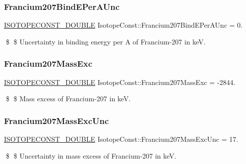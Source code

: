\subsubsection{\texorpdfstring{Francium207\+Bind\+E\+Per\+A\+Unc}{Francium207BindEPerAUnc}}
{\footnotesize\ttfamily \mbox{\hyperlink{group___isotope_const-_macros_ga8f45a7272ce02c0b4c65c44636ed719a}{I\+S\+O\+T\+O\+P\+E\+C\+O\+N\+S\+T\+\_\+\+D\+O\+U\+B\+LE}} Isotope\+Const\+::\+Francium207\+Bind\+E\+Per\+A\+Unc = 0.}

\$ \$ Uncertainty in binding energy per A of Francium-\/207 in keV. \mbox{\label{group___isotope_const-_francium-_fr207_gad07af3ba138f6140794e2d267827e579}} 
\subsubsection{\texorpdfstring{Francium207\+Mass\+Exc}{Francium207MassExc}}
{\footnotesize\ttfamily \mbox{\hyperlink{group___isotope_const-_macros_ga8f45a7272ce02c0b4c65c44636ed719a}{I\+S\+O\+T\+O\+P\+E\+C\+O\+N\+S\+T\+\_\+\+D\+O\+U\+B\+LE}} Isotope\+Const\+::\+Francium207\+Mass\+Exc = -\/2844.}

\$ \$ Mass excess of Francium-\/207 in keV. \mbox{\label{group___isotope_const-_francium-_fr207_ga87d59580c3d74c77c4c852e4df0fae9b}} 
\subsubsection{\texorpdfstring{Francium207\+Mass\+Exc\+Unc}{Francium207MassExcUnc}}
{\footnotesize\ttfamily \mbox{\hyperlink{group___isotope_const-_macros_ga8f45a7272ce02c0b4c65c44636ed719a}{I\+S\+O\+T\+O\+P\+E\+C\+O\+N\+S\+T\+\_\+\+D\+O\+U\+B\+LE}} Isotope\+Const\+::\+Francium207\+Mass\+Exc\+Unc = 17.}

\$ \$ Uncertainty in mass excess of Francium-\/207 in keV. \mbox{\label{group___isotope_const-_francium-_fr207_ga40148a842a52700617809f2070c6ce05}} 

